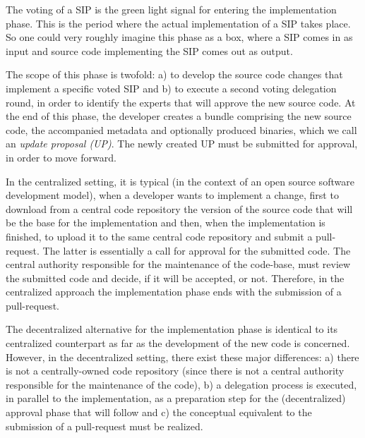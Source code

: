 The voting of a SIP is the green light signal for entering the implementation phase. This is the period where the actual implementation of a SIP takes place. So one could very roughly imagine this phase as a box, where a SIP comes in as input and source code implementing the SIP comes out as output.

The scope of this phase is twofold: a) to develop the source code changes that implement a specific voted SIP and b) to execute a second voting delegation round, in order to identify the experts that will approve the new source code. At the end of this phase, the developer creates a bundle comprising the new source code, the accompanied metadata and optionally produced binaries, which we call an \emph{update proposal (UP)}. The newly created UP must be submitted for approval, in order to move forward.

In the centralized setting, it is typical (in the context of an open source software development model), when a developer wants to implement a change, first to download from a central code repository the version of the source code that will be the base for the implementation and then, when the implementation is finished, to upload it to the same central code repository and submit a pull-request. The latter is essentially a call for approval for the submitted code. The central authority responsible for the maintenance of the code-base, must review the submitted code and decide, if it will be accepted, or not. Therefore, in the centralized approach the implementation phase ends with the submission of a pull-request.

The decentralized alternative for the implementation phase is identical to its centralized counterpart as far as the development of the new code is concerned. However, in the decentralized setting, there exist these major differences:
a) there is not a centrally-owned code repository (since there is not a central authority responsible for the maintenance of the code), b) a delegation process is executed, in parallel to the implementation, as a preparation step for the (decentralized) approval phase that will follow and c) the conceptual equivalent to the submission of a pull-request must be realized.

